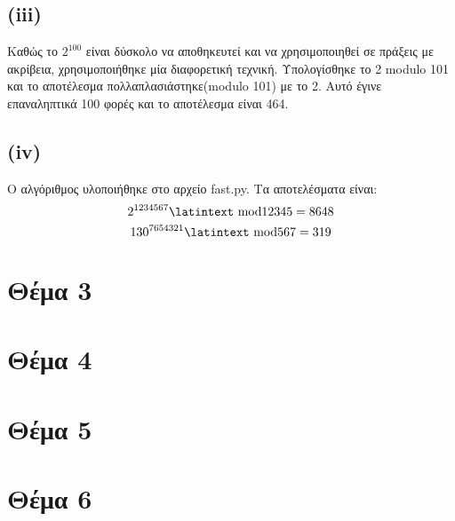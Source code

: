\documentclass[a4paper, 11pt]{article}
\newcommand{\lt}{\latintext}
\begin{document}
\subsection*{({\lt iii})}
Καθώς το $2^{100}$ είναι δύσκολο να αποθηκευτεί και να χρησιμοποιηθεί σε πράξεις με ακρίβεια, χρησιμοποιήθηκε μία διαφορετική τεχνική. Υπολογίσθηκε το 2 {\lt modulo} 101 και το αποτέλεσμα πολλαπλασιάστηκε({\lt modulo} 101) με το 2. Αυτό έγινε επαναληπτικά 100 φορές και το αποτέλεσμα είναι 464.

\subsection*{({\lt iv})}
Ο αλγόριθμος υλοποιήθηκε στο αρχείο {\lt fast.py}. Τα αποτελέσματα είναι:
\[2^{1234567} \textrm{\lt mod} 12345 = 8648\]
\[130^{7654321} \textrm{\lt mod} 567 = 319\]
\newpage


\section*{Θέμα 3}

\newpage


\section*{Θέμα 4}

\section*{Θέμα 5}


\newpage
\section*{Θέμα 6}
\end{document}
